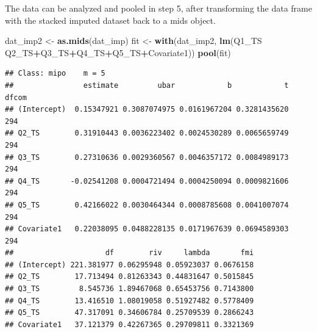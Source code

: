 \documentclass[]{book}
\newenvironment{Shaded}{\begin{snugshade}}{\end{snugshade}}
\newcommand{\KeywordTok}[1]{\textcolor[rgb]{0.13,0.29,0.53}{\textbf{#1}}}
\newcommand{\DataTypeTok}[1]{\textcolor[rgb]{0.13,0.29,0.53}{#1}}
\newcommand{\StringTok}[1]{\textcolor[rgb]{0.31,0.60,0.02}{#1}}
\newcommand{\OtherTok}[1]{\textcolor[rgb]{0.56,0.35,0.01}{#1}}
\newcommand{\OperatorTok}[1]{\textcolor[rgb]{0.81,0.36,0.00}{\textbf{#1}}}
\newcommand{\NormalTok}[1]{#1}
\begin{document}
\begin{Shaded}
\end{Shaded}

The data can be analyzed and pooled in step 5, after transforming the
data frame with the stacked imputed dataset back to a mids object.

\begin{Shaded}
\begin{Highlighting}[]
\NormalTok{dat_imp2 <-}\StringTok{ }\KeywordTok{as.mids}\NormalTok{(dat_imp)}
\NormalTok{fit <-}\StringTok{ }\KeywordTok{with}\NormalTok{(dat_imp2, }\KeywordTok{lm}\NormalTok{(Q1_TS}\OperatorTok{~}\StringTok{ }\NormalTok{Q2_TS}\OperatorTok{+}\NormalTok{Q3_TS}\OperatorTok{+}\NormalTok{Q4_TS}\OperatorTok{+}\NormalTok{Q5_TS}\OperatorTok{+}\NormalTok{Covariate1))}
\KeywordTok{pool}\NormalTok{(fit)}
\end{Highlighting}
\end{Shaded}

\begin{verbatim}
## Class: mipo    m = 5 
##                estimate         ubar            b            t dfcom
## (Intercept)  0.15347921 0.3087074975 0.0161967204 0.3281435620   294
## Q2_TS        0.31910443 0.0036223402 0.0024530289 0.0065659749   294
## Q3_TS        0.27310636 0.0029360567 0.0046357172 0.0084989173   294
## Q4_TS       -0.02541208 0.0004721494 0.0004250094 0.0009821606   294
## Q5_TS        0.42166022 0.0030464344 0.0008785608 0.0041007074   294
## Covariate1   0.22038095 0.0488228135 0.0171967639 0.0694589303   294
##                     df        riv     lambda       fmi
## (Intercept) 221.381977 0.06295948 0.05923037 0.0676158
## Q2_TS        17.713494 0.81263343 0.44831647 0.5015845
## Q3_TS         8.545736 1.89467068 0.65453756 0.7143800
## Q4_TS        13.416510 1.08019058 0.51927482 0.5778409
## Q5_TS        47.317091 0.34606784 0.25709539 0.2866243
## Covariate1   37.121379 0.42267365 0.29709811 0.3321369
\end{verbatim}
\end{document}
